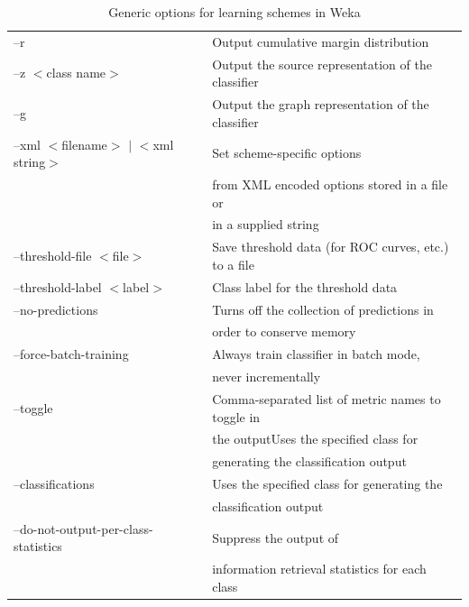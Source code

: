 \begin{table}[!thp]
{\begin{tabular}{ll}
--r & Output cumulative margin distribution \\
--z $<$class name$>$ &Output the source representation of the classifier \\
--g & Output the graph representation of the classifier \\
--xml $<$filename$>$ $|$ $<$xml string$>$ & Set scheme-specific options \\
& from XML encoded options stored in a file or \\ 
& in a supplied string \\
--threshold-file $<$file$>$ & Save threshold data (for ROC curves, etc.) to a file \\
--threshold-label $<$label$>$ & Class label for the threshold data \\
--no-predictions & Turns off the collection of predictions in \\
& order to conserve memory \\
--force-batch-training & Always train classifier in batch mode, \\
& never incrementally \\
--toggle & Comma-separated list of metric names to toggle in \\
&  the outputUses the specified class for \\ 
& generating the classification output \\
--classifications & Uses the specified class for generating the \\
& classification output \\
--do-not-output-per-class-statistics & Suppress the output of \\
& information retrieval statistics for each class \\
\hline
\end{tabular} \footnotesize \par}
\caption{\label{table:general_command_line_opts}Generic options for learning schemes in Weka}
\end{table}


